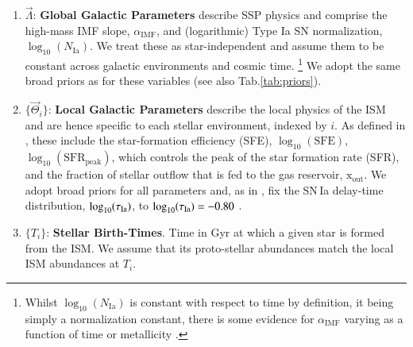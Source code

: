 \documentclass{aa}
\begin{document}
\begin{enumerate}
     \item $\vec\Lambda$: \textbf{Global Galactic Parameters} describe SSP physics and comprise the high-mass \citet{2003PASP..115..763C} IMF slope, $\alpha_\mathrm{IMF}$, and (logarithmic) Type Ia SN normalization, $\log_{10}(N_\mathrm{Ia})$. We treat these as star-independent and assume them to be constant across galactic environments and cosmic time. \footnote{Whilst $\log_{10}(N_\mathrm{Ia})$ is constant with respect to time by definition, it being simply a normalization constant, there is some evidence for $\alpha_\mathrm{IMF}$ varying as a function of time or metallicity \citep{2014ApJ...796...75C,2016MNRAS.462.2832C,2019MNRAS.482..118G,2019A&A...626A.124M}.} We adopt the same broad priors as \citep{Philcox_2019} for these variables (see also Tab.\ref{tab:priors}).  
     \item $\{\vec\Theta_i\}$: \textbf{Local Galactic Parameters} describe the local physics of the ISM and are hence specific to each stellar environment, indexed by $i$. As defined in \citep{Rybizki_2017}, these include the star-formation efficiency (SFE), $\log_{10}(\text{SFE})$, $\log_{10}(\mathrm{SFR}_\mathrm{peak})$, which controls the peak of the star formation rate (SFR), and the fraction of stellar outflow that is fed to the gas reservoir, $\mathrm{x}_\mathrm{out}$. We adopt broad priors for all parameters and, as in \citep{Philcox_2019}, fix the SN\,Ia delay-time distribution, $\log_{10}(\tau_{\rm Ia})$, to $\log_{10}(\tau_{\rm Ia})=-0.80$ \citep[see also][]{Philcox_2018}.
     \item $\{T_i\}$: \textbf{Stellar Birth-Times}. Time in Gyr at which a given star is formed from the ISM. We assume that its proto-stellar abundances match the local ISM abundances at $T_i$.
\end{enumerate}

\end{document}
